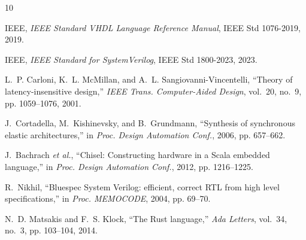 \documentclass[journal,9pt]{IEEEtran}
\begin{document}
\begin{thebibliography}{10}

IEEE, \emph{IEEE Standard VHDL Language Reference Manual}, IEEE Std
1076-2019, 2019.

IEEE, \emph{IEEE Standard for SystemVerilog}, IEEE Std 1800-2023, 2023.

L.~P. Carloni, K.~L. McMillan, and A.~L. Sangiovanni-Vincentelli, ``Theory of
latency-insensitive design,'' \emph{IEEE Trans. Computer-Aided Design},
vol.~20, no.~9, pp. 1059--1076, 2001.

J.~Cortadella, M.~Kishinevsky, and B.~Grundmann, ``Synthesis of synchronous
elastic architectures,'' in \emph{Proc. Design Automation Conf.}, 2006, pp.
657--662.

J.~Bachrach \emph{et al.}, ``Chisel: Constructing hardware in a Scala embedded
language,'' in \emph{Proc. Design Automation Conf.}, 2012, pp. 1216--1225.

R.~Nikhil, ``Bluespec System Verilog: efficient, correct RTL from high level
specifications,'' in \emph{Proc. MEMOCODE}, 2004, pp. 69--70.

N.~D. Matsakis and F.~S. Klock, ``The Rust language,'' \emph{Ada Letters},
vol.~34, no.~3, pp. 103--104, 2014.

\end{thebibliography}
\end{document}

